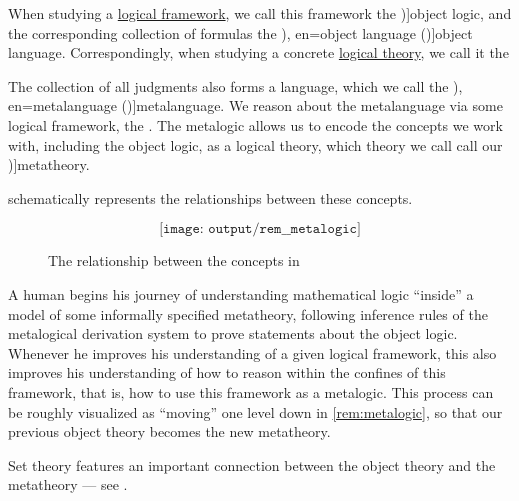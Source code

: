 \begin{remark}\label{rem:metalogic}
  When studying a \hyperref[def:logical_framework]{logical framework}, we call this framework the \term[en=object logic (\cite[3]{Kleene2002Logic})]{object logic}, and the corresponding collection of formulas the \term[ru=предметный язык (\cite[35]{Герасимов2011}), en=object language (\cite[3]{Kleene2002Logic})]{object language}. Correspondingly, when studying a concrete \hyperref[def:logical_theory]{logical theory}, we call it the 

  The collection of all judgments also forms a language, which we call the \term[ru=метаязык (\cite[35]{Герасимов2011}), en=metalanguage (\cite[3]{Kleene2002Logic})]{metalanguage}. We reason about the metalanguage via some logical framework, the . The metalogic allows us to encode the concepts we work with, including the object logic, as a logical theory, which theory we call call our \term[en=metatheory (\cite[199]{Kleene2002Logic})]{metatheory}.

   schematically represents the relationships between these concepts.

  \begin{figure}[!ht]
    \begin{equation*}
      \texttt{[image: output/rem\_\_metalogic]}
    \end{equation*}
    \caption{The relationship between the concepts in }\label{fig:rem:metalogic}
  \end{figure}
\end{remark}
\begin{comments}
  \item A human begins his journey of understanding mathematical logic \enquote{inside} a model of some informally specified metatheory, following inference rules of the metalogical derivation system to prove statements about the object logic. Whenever he improves his understanding of a given logical framework, this also improves his understanding of how to reason within the confines of this framework, that is, how to use this framework as a metalogic. This process can be roughly visualized as \enquote{moving} one level down in \cref{rem:metalogic}, so that our previous object theory becomes the new metatheory.

  \item Set theory features an important connection between the object theory and the metatheory --- see .
\end{comments}

